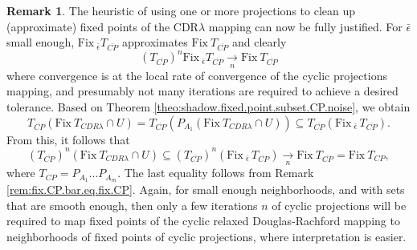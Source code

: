\documentclass[12pt]{article}
\theoremstyle{definition}
\newtheorem{remark}{Remark}
\newcommand{\Fix}{\mathrm{Fix}\ }
\begin{document}
\begin{remark}
The heuristic of using one or more projections to clean up (approximate) fixed points of the CDR$\lambda$ mapping
can now be fully justified.
    For $\bar{\epsilon}$ small enough, $\Fix_{\!\!\bar{\epsilon}}T_{\overline{CP}}$ approximates $\Fix T_{\overline{CP}}$ and
    clearly
    \begin{equation}
    (T_{\overline{CP}})^n\Fix_{\!\!\bar{\epsilon}}T_{\overline{CP}}\underset{n}{\to} \Fix T_{\overline{CP}}
    \end{equation}
    where convergence is at the local rate of convergence of the cyclic projections mapping, and presumably not many
    iterations are required to achieve a desired tolerance.
Based on Theorem \ref{theo:shadow.fixed.point.subset.CP.noise}, we obtain
\begin{equation}\label{eq:hybrid.CDRl.CP}
T_{\overline{CP}}(\Fix T_{CDR\lambda}\cap U)=T_{\overline{CP}}(P_{A_1}(\Fix T_{CDR\lambda}\cap U))\subseteq T_{\overline{CP}}(\Fix_{\!\!\bar\epsilon}\, T_{\overline{CP}}).
\end{equation}
From this, it follows that 
\begin{equation}
(T_{\overline{CP}})^n(\Fix T_{CDR\lambda}\cap U) \subseteq (T_{\overline{CP}})^n(\Fix_{\!\!\bar\epsilon}\, T_{\overline{CP}})\underset{n}{\to} \Fix T_{\overline{CP}}=\Fix T_{CP},
\end{equation}
where $T_{CP}=P_{A_1}\dots P_{A_m}$.
The last equality follows from Remark \ref{rem:fix.CP.bar.eq.fix.CP}.
Again, for small enough neighborhoods, and with sets that are smooth enough, then only a few
iterations $n$ of cyclic projections
will be required to map fixed points of the cyclic relaxed Douglas-Rachford mapping to
neighborhoods of fixed points of cyclic projections, where
interpretation is easier.
\end{remark}

\fi
\end{document}
